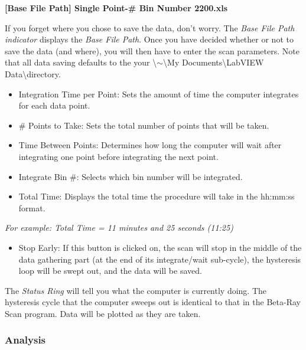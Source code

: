 \documentclass{../lab}
\begin{document}
\textbf{[Base File Path] Single Point-\# Bin Number 2200.xls}

If you forget where you chose to save the data, don't worry. The \emph{Base File Path indicator} displays the \emph{Base File Path}. Once you have decided whether or not to save the data (and where), you will then have to enter the scan parameters. Note that all data saving defaults to the your \textbackslash$\sim$\textbackslash My Documents\textbackslash LabVIEW Data\textbackslash directory.

\begin{itemize}
    \item Integration Time per Point: Sets the amount of time the computer integrates for each data point.

    \item \# Points to Take: Sets the total number of points that will be taken.

    \item Time Between Points: Determines how long the computer will wait after integrating one point before integrating the next point.

    \item Integrate Bin \#: Selects which bin number will be integrated.

    \item Total Time: Displays the total time the procedure will take in the hh:mm:ss format.

\end{itemize}

\emph{For example: Total Time = 11 minutes and 25 seconds (11:25)}

\begin{itemize}
    \item Stop Early: If this button is clicked on, the scan will stop in the middle of the data gathering part (at the end of its integrate/wait sub-cycle), the hysteresis loop will be swept out, and the data will be saved.

\end{itemize}

The \emph{Status Ring} will tell you what the computer is currently doing. The hysteresis cycle that the computer sweeps out is identical to that in the Beta-Ray Scan program. Data will be plotted as they are taken.

\subsubsection{Analysis}
\end{document}
